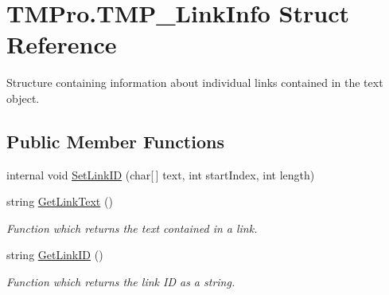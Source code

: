 \hypertarget{struct_t_m_pro_1_1_t_m_p___link_info}{}\section{T\+M\+Pro.\+T\+M\+P\+\_\+\+Link\+Info Struct Reference}
\label{struct_t_m_pro_1_1_t_m_p___link_info}


Structure containing information about individual links contained in the text object.  


\subsection*{Public Member Functions}
\begin{DoxyCompactItemize}
\item 
internal void \mbox{\hyperlink{struct_t_m_pro_1_1_t_m_p___link_info_a523ba1edb25ad8f18799dde7212fb271}{Set\+Link\+ID}} (char\mbox{[}$\,$\mbox{]} text, int start\+Index, int length)
\item 
string \mbox{\hyperlink{struct_t_m_pro_1_1_t_m_p___link_info_a8d7343120f5d1fb29227802fae0f9b0f}{Get\+Link\+Text}} ()
\begin{DoxyCompactList}\small\item\em Function which returns the text contained in a link. \end{DoxyCompactList}\item 
string \mbox{\hyperlink{struct_t_m_pro_1_1_t_m_p___link_info_aab1c52fff84f197d1ab52d9f915c1c03}{Get\+Link\+ID}} ()
\begin{DoxyCompactList}\small\item\em Function which returns the link ID as a string. \end{DoxyCompactList}\end{DoxyCompactItemize}
